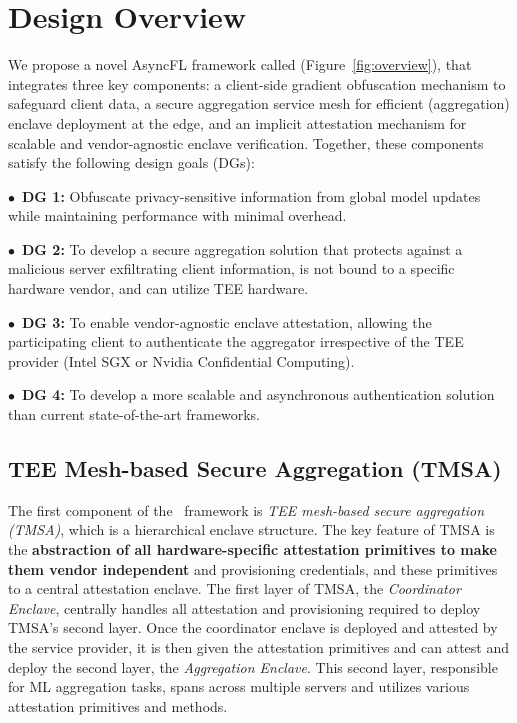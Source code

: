 \section{Design Overview}
\label{sec04}
We propose a novel AsyncFL framework called \sysname (Figure~\ref{fig:overview}), that integrates three key components: a client-side gradient obfuscation mechanism to safeguard client data, a secure aggregation service mesh for efficient (aggregation) enclave deployment at the edge, and an implicit attestation mechanism for scalable and vendor-agnostic enclave verification. Together, these components satisfy the following design goals (DGs):
    
\noindent $\bullet$ \,{\bf DG 1:} Obfuscate privacy-sensitive information from global model updates while maintaining performance with minimal overhead. 

\noindent $\bullet$ \,{\bf DG 2:} To develop a secure aggregation solution that protects against a malicious server exfiltrating client information, is not bound to a specific hardware vendor, and can utilize TEE hardware.

\noindent $\bullet$ \,{\bf DG 3:} To enable vendor-agnostic enclave attestation, allowing the participating client to authenticate the aggregator irrespective of the TEE provider (\eg Intel SGX or Nvidia Confidential Computing).

\noindent $\bullet$ \,{\bf DG 4:} To develop a more scalable and asynchronous authentication solution than current state-of-the-art frameworks.



    
\subsection{TEE Mesh-based Secure Aggregation (TMSA)}
\label{subsec04-01}
The first component of the \sysname~framework is {\it TEE mesh-based secure aggregation (TMSA)}, which is a hierarchical enclave structure. The key feature of TMSA is the {\bf abstraction of all hardware-specific attestation primitives to make them vendor independent} and provisioning credentials, and these primitives to a central attestation enclave. 
The first layer of TMSA, the \textit{Coordinator Enclave}, centrally handles all attestation and provisioning required to deploy TMSA's second layer. %
Once the coordinator enclave is deployed and attested by the service provider, it is then given the attestation primitives and can attest and deploy the second layer, the \textit{Aggregation Enclave}.
This second layer, responsible for ML aggregation tasks, spans across multiple servers and utilizes various attestation primitives and methods.

